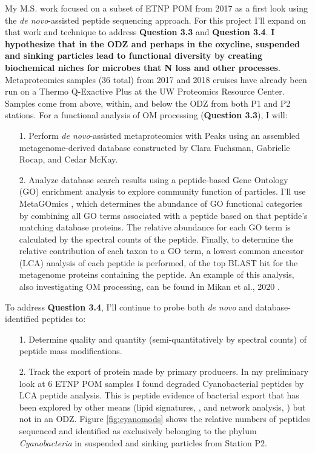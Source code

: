 \documentclass[12pt, letterpaper, twoside]{article}
\begin{document}
My M.S. work focused on a subset of ETNP POM from 2017 as a first look using the \textit{de novo}-assisted peptide sequencing approach. For this project I'll expand on that work and technique to address \textbf{Question 3.3} and \textbf{Question 3.4}. \textbf{I hypothesize that in the ODZ and perhaps in the oxycline, suspended and sinking particles lead to functional diversity by creating biochemical niches for microbes that  N loss and other processes}. Metaproteomics samples (36 total) from 2017 and 2018 cruises have already been run on a Thermo Q-Exactive Plus at the UW Proteomics Resource Center. Samples come from above, within, and below the ODZ from both P1 and P2 stations. For a functional analysis of OM processing (\textbf{Question 3.3}), I will:

\begin{enumerate}
	\item[1.] Perform \textit{de novo}-assisted metaproteomics with Peaks using an assembled metagenome-derived database constructed by Clara Fuchsman, Gabrielle Rocap, and Cedar McKay.
	\item[2.] Analyze database search results using a peptide-based Gene Ontology (GO) enrichment analysis to explore community function of particles. I'll use MetaGOmics \cite{riffle_metagomics_2017}, which determines the abundance of GO functional categories by combining all GO terms associated with a peptide based on that peptide's matching database proteins. The relative abundance for each GO term is calculated by the spectral counts of the peptide. Finally, to determine the relative contribution of each taxon to a GO term, a lowest common ancestor (LCA) analysis of each peptide is performed, of the top BLAST hit for the metagenome proteins containing the peptide. An example of this analysis, also investigating OM processing, can be found in Mikan et al., 2020 \cite{mikan_metaproteomics_2020}.
\end{enumerate}  

To address \textbf{Question 3.4}, I'll continue to probe both \textit{de novo} and database-identified peptides to:

\begin{enumerate}
	\item[1.] Determine quality and quantity (semi-quantitatively by spectral counts) of peptide mass modifications.
	\item[2.] Track the export of protein made by primary producers. In my preliminary look at 6 ETNP POM samples I found degraded Cyanobacterial peptides by LCA peptide analysis. This is peptide evidence of bacterial export that has been explored by other means (lipid signatures, \cite{close_export_2013}, and network analysis, \cite{richardson_small_2007}) but not in an ODZ. Figure \ref{fig:cyanomods} shows the relative numbers of peptides sequenced and identified as exclusively belonging to the phylum \textit{Cyanobacteria} in suspended and sinking particles from Station P2.
\end{enumerate}
\end{document}
